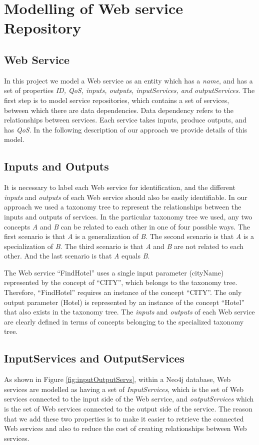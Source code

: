 \section{Modelling of Web service Repository} \label{procesedGD}
\subsection {Web Service}
In this project we model a Web service as an entity which has a \emph{name}, and has a set of properties \emph{ID, QoS, inputs, outputs, inputServices, and outputServices}. The first step is to model service repositories, which contains a set of services, between which there are data dependencies. Data dependency refers to the relationships between services. Each service takes inputs, produce outputs, and has \emph{QoS}. In the following description of our approach we provide details of this model.\par
\subsection {Inputs and Outputs}
It is necessary to label each Web service for identification, and the different \emph{inputs} and  \emph{outputs} of each Web service should also be easily identifiable. In our approach we used a taxonomy tree to represent the relationships between the inputs and outputs of services. In the particular taxonomy tree we used, any two concepts \emph{A} and \emph{B} can be related to each other in one of four possible ways. The first scenario is that \emph{A} is a generalization of \emph{B}. The second scenario is that \emph{A} is a specialization of \emph{B}. The third scenario is that \emph{A} and \emph{B} are not related to each other. And the last scenario is that  \emph{A} equals \emph{B}. 
\newcommand{\quotes}[1]{``#1''}
\begin{example}
\noindent
The Web service \quotes{FindHotel} uses a single input parameter (cityName) represented by the concept of \quotes{CITY}, which belongs to the taxonomy tree. Therefore, \quotes{FindHotel} requires an instance of the concept \quotes{CITY}. The only output parameter (Hotel) is represented by an instance of the concept \quotes{Hotel} that also exists in the taxonomy tree. The \emph{inputs} and \emph{outputs} of each Web service are clearly defined in terms of concepts belonging to the specialized taxonomy tree.
\end{example}


\subsection {InputServices and OutputServices}
As shown in Figure \ref{fig:inputOutputServs}, within a Neo4j database, Web services are modelled as having a set of \emph{InputServices}, which is the set of Web services connected to the input side of the Web service, and  \emph{outputServices} which is the set of Web services connected to the output side of the service. The reason that we add these two properties is to make it easier to retrieve the connected Web services and also to reduce the cost of creating relationships between Web services. \par



